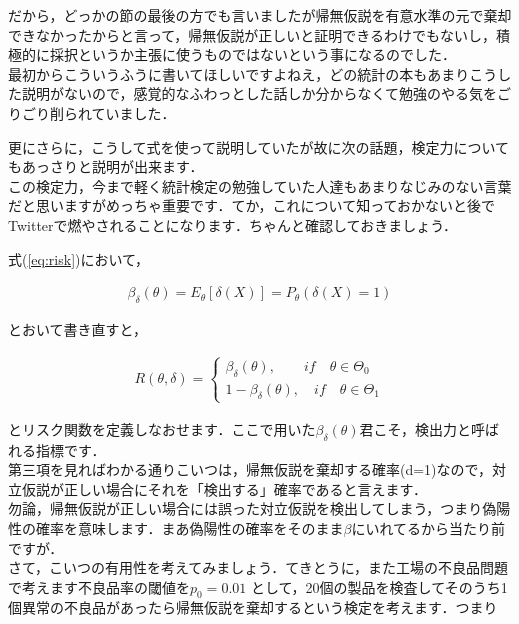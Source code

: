 \documentclass[11pt,a4paper,uplatex]{ujreport} 	%
\begin{document}
だから，どっかの節の最後の方でも言いましたが帰無仮説を有意水準の元で棄却できなかったからと言って，帰無仮説が正しいと証明できるわけでもないし，積極的に採択というか主張に使うものではないという事になるのでした．\\

最初からこういうふうに書いてほしいですよねえ，どの統計の本もあまりこうした説明がないので，感覚的なふわっとした話しか分からなくて勉強のやる気をごりごり削られていました．

更にさらに，こうして式を使って説明していたが故に次の話題，検定力についてもあっさりと説明が出来ます．\\

この検定力，今まで軽く統計検定の勉強していた人達もあまりなじみのない言葉だと思いますがめっちゃ重要です．てか，これについて知っておかないと後でTwitterで燃やされることになります．ちゃんと確認しておきましょう．

式(\ref{eq:risk})において，

\begin{align}
  \beta_\delta(\theta) = E_\theta[\delta(X)] = P_\theta(\delta(X)=1)
\end{align}

とおいて書き直すと，

\begin{align}
  R(\theta, \delta) = 
  \left\{
    \begin{array}{l}
    \beta_\delta(\theta), \qquad if \quad \theta \in \Theta_0\\
    1-\beta_\delta(\theta), \quad if \quad \theta \in \Theta_1
    \end{array}
  \right.
  \label{eq:risk2}
\end{align}

とリスク関数を定義しなおせます．ここで用いた$\beta_\delta(\theta)$君こそ，検出力と呼ばれる指標です．\\

第三項を見ればわかる通りこいつは，帰無仮説を棄却する確率(d=1)なので，対立仮説が正しい場合にそれを「検出する」確率であると言えます．\\

勿論，帰無仮説が正しい場合には誤った対立仮説を検出してしまう，つまり偽陽性の確率を意味します．まあ偽陽性の確率をそのまま$\beta$にいれてるから当たり前ですが．\\

さて，こいつの有用性を考えてみましょう．てきとうに，また工場の不良品問題で考えます不良品率の閾値を$p_0=0.01$
として，20個の製品を検査してそのうち1個異常の不良品があったら帰無仮説を棄却するという検定を考えます．つまり
\end{document}
